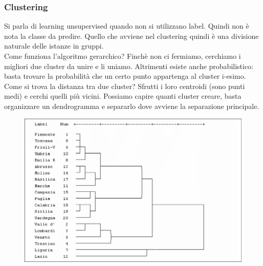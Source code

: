 \subsubsection{Clustering}
Si parla di learning unsupervised quando non si utilizzano label. Quindi non è nota la classe da predire. Quello che avviene nel clustering quindi è una divisione naturale delle istanze in gruppi. 
\\
Come funziona l'algoritmo gerarchico? Finchè non ci fermiamo, cerchiamo i migliori due cluster da unire e li uniamo. Altrimenti esiste anche probabilistico: basta trovare la probabilità che un certo punto appartenga al cluster i-esimo. Come si trova la distanza tra due cluster? Sfrutti i loro centroidi (sono punti medi) e cerchi quelli più vicini. Possiamo capire quanti cluster creare, basta organizzare un dendrogramma e separarlo dove avviene la separazione principale. 
\\
\begin{figure}[th]
    \centering
    \includegraphics[scale=0.5]{ML/img/dendrogramma.png}
\end{figure}
\\